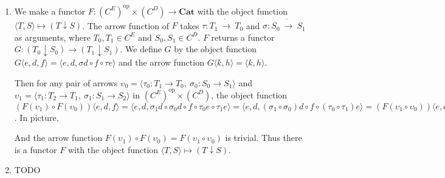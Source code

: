 \documentclass[luatex]{article}
\begin{document}
\showArt

\begin{enumerate}[label=(\alph*)]
  \item We make a functor $F : (C^E)^{\mathrm{op}} \times (C^D) \rightarrow \mathbf{Cat}$ with the object function $\langle T, S \rangle \mapsto (T \downarrow S)$. The arrow function of $F$ takes $\tau : T_1\ \dot{\rightarrow}\ T_0$ and $\sigma : S_0\ \dot{\rightarrow}\ S_1$ as arguments, where $T_0, T_1 \in C^E$ and $S_0, S_1 \in C^D$. $F$ returns a functor $G : (T_0 \downarrow S_0) \rightarrow (T_1 \downarrow S_1)$. We define $G$ by the object function $G\langle e, d, f \rangle = \langle e, d, \sigma d \circ f \circ \tau e \rangle$ and the arrow function $G\langle k, h \rangle = \langle k, h \rangle$.
  
  Then for any pair of arrows $\upsilon_0 = \langle \tau_0 : T_1 \rightarrow T_0,\ \sigma_0 : S_0 \rightarrow S_1\rangle$ and $\upsilon_1 = \langle \tau_1 : T_2 \rightarrow T_1,\ \sigma_1 : S_1 \rightarrow S_2\rangle$ in $(C^E)^\mathrm{op} \times (C^D)$, the object function $(F(\upsilon_1) \circ F(\upsilon_0))\langle e, d, f \rangle = \langle e, d, \sigma_1 d \circ \sigma_0 d \circ f \circ \tau_0 e \circ \tau_1 e \rangle = \langle e, d, (\sigma_1 \circ \sigma_0) d \circ f \circ (\tau_0 \circ \tau_1) e \rangle = (F(\upsilon_1 \circ \upsilon_0))\langle e, d, f \rangle$. In picture, 

  \begin{center}
  \end{center}

  And the arrow function $F(\upsilon_1) \circ F(\upsilon_0) = F(\upsilon_1 \circ \upsilon_0)$ is trivial. Thus there is a functor $F$ with the object function $\langle T, S \rangle \mapsto (T \downarrow S)$.

  \item TODO
\end{enumerate}

\subsection{}
\end{document}

